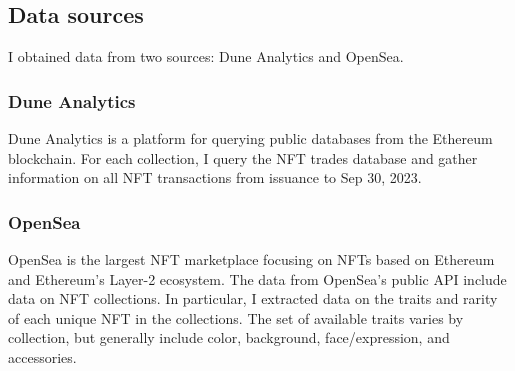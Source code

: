 \documentclass[12pt]{article}
\begin{document}
\subsection{Data sources}
I obtained data from two sources: Dune Analytics and OpenSea.

\subsubsection{Dune Analytics}
Dune Analytics is a platform for querying public databases from the Ethereum blockchain. For each collection, I query the NFT trades database and gather information on all NFT transactions from issuance to Sep 30, 2023.

\subsubsection{OpenSea}
OpenSea is the largest NFT marketplace focusing on NFTs based on Ethereum and Ethereum's Layer-2 ecosystem. The data from OpenSea's public API include data on NFT collections. In particular, I extracted data on the traits and rarity of each unique NFT in the collections. The set of available traits varies by collection, but generally include color, background, face/expression, and accessories.
\end{document}
